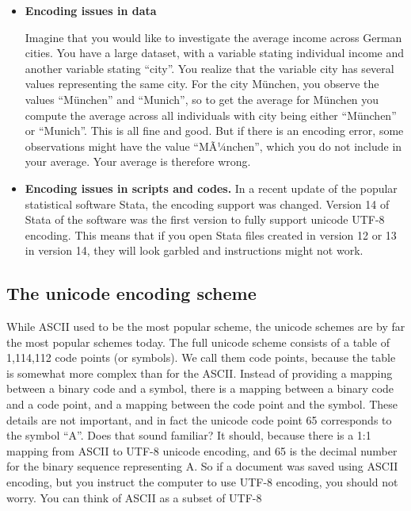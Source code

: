 \documentclass[]{book}
\begin{document}
\begin{itemize}
\item
  \textbf{Encoding issues in data}

  Imagine that you would like to investigate the average income across German cities. You have a large dataset, with a variable stating individual income and another variable stating ``city''. You realize that the variable city has several values representing the same city. For the city München, you observe the values ``München'' and ``Munich'', so to get the average for München you compute the average across all individuals with city being either ``München'' or ``Munich''. This is all fine and good. But if there is an encoding error, some observations might have the value ``MÃ¼nchen'', which you do not include in your average. Your average is therefore wrong.
\item
  \textbf{Encoding issues in scripts and codes.}
  In a recent update of the popular statistical software Stata, the encoding support was changed. Version 14 of Stata of the software was the first version to fully support unicode UTF-8 encoding. This means that if you open Stata files created in version 12 or 13 in version 14, they will look garbled and instructions might not work.
\end{itemize}

\hypertarget{the-unicode-encoding-scheme}{%
\subsection{The unicode encoding scheme}\label{the-unicode-encoding-scheme}}

While ASCII used to be the most popular scheme, the unicode schemes are by far the most popular schemes today. The full unicode scheme consists of a table of 1,114,112 code points (or symbols). We call them code points, because the table is somewhat more complex than for the ASCII. Instead of providing a mapping between a binary code and a symbol, there is a mapping between a binary code and a code point, and a mapping between the code point and the symbol. These details are not important, and in fact the unicode code point 65 corresponds to the symbol ``A''. Does that sound familiar? It should, because there is a 1:1 mapping from ASCII to UTF-8 unicode encoding, and 65 is the decimal number for the binary sequence representing A. So if a document was saved using ASCII encoding, but you instruct the computer to use UTF-8 encoding, you should not worry. You can think of ASCII as a subset of UTF-8
\end{document}
